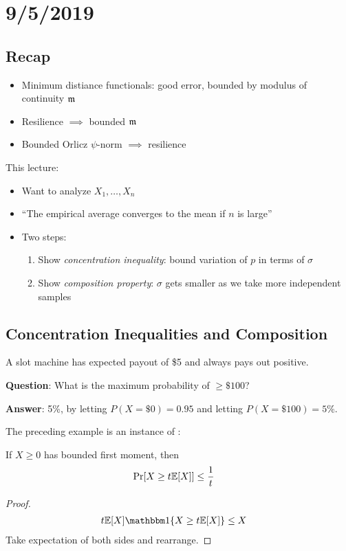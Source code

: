 \section{9/5/2019}

\subsection{Recap}

\begin{itemize}
    \item Minimum distiance functionals: good error, bounded by modulus of continuity $\mathfrak{m}$
    \item Resilience $\implies$ bounded $\mathfrak{m}$
    \item Bounded Orlicz $\psi$-norm $\implies$ resilience
\end{itemize}
This lecture:
\begin{itemize}
    \item Want to analyze $X_1, \ldots, X_n$
    \item ``The empirical average converges to the mean if $n$ is large''
    \item Two steps:
    \begin{enumerate}
        \item Show \emph{concentration inequality}: bound variation of $p$ in terms of $\sigma$
        \item Show \emph{composition property}: $\sigma$ gets smaller as we take more independent samples
    \end{enumerate}
\end{itemize}

\subsection{Concentration Inequalities and Composition}

\begin{example}
    A slot machine has expected payout of \$5 and always pays out positive.
    
    \textbf{Question}: What is the maximum probability of $\geq \$100$?
    
    \textbf{Answer}: 5\%, by letting $P(X=\$0) = 0.95$ and letting $P(X=\$100) = 5\%$.
\end{example}

The preceding example is an instance of :
\begin{theorem}\label{thm:markov}
    If $X \geq 0$ has bounded first moment, then
    \begin{align}
        \Pr[X \geq t \mathbb{E}[X]] &\leq \frac{1}{t}
    \end{align}
\end{theorem}
\begin{proof}
    \begin{align}  
        t \ex[X] \ind\{X \geq t \ex[X]\} &\leq X
    \end{align}
    Take expectation of both sides and rearrange.
\end{proof}

